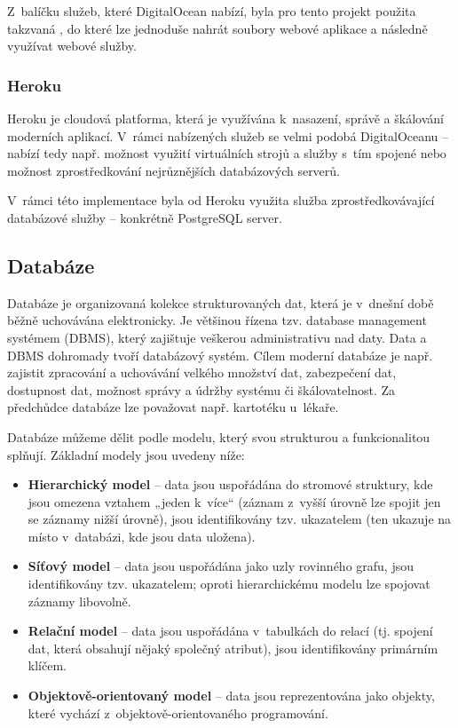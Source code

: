 		Z~balíčku služeb, které DigitalOcean nabízí, byla pro tento projekt použita takzvaná  \cite{DO3}, do které lze jednoduše nahrát soubory webové aplikace a následně využívat webové služby.
		
		\subsubsection{Heroku}\label{sec:heroku}
		Heroku je cloudová platforma, která je využívána k~nasazení, správě a škálování moderních aplikací. V~rámci nabízených služeb se velmi podobá DigitalOceanu – nabízí tedy např. možnost využití virtuálních strojů a služby s~tím spojené nebo možnost zprostředkování nejrůznějších databázových serverů. \cite{Heroku1}\cite{Heroku2}
		
		V~rámci této implementace byla od Heroku využita služba zprostředkovávající databázové služby – konkrétně PostgreSQL server. 
		
	\subsection{Databáze}
	Databáze je organizovaná kolekce strukturovaných dat, která je v~dnešní době běžně uchovávána elektronicky. Je většinou řízena tzv. database management systémem (DBMS), který zajištuje veškerou administrativu nad daty. Data a DBMS dohromady tvoří databázový systém. Cílem moderní databáze je např. zajistit zpracování a uchovávání velkého množství dat, zabezpečení dat, dostupnost dat, možnost správy a údržby systému či škálovatelnost. Za předchůdce databáze lze považovat např. kartotéku u~lékaře. \cite{DBSummary}
	
	
	
	Databáze můžeme dělit podle modelu, který svou strukturou a funkcionalitou splňují. Základní modely jsou uvedeny níže: \cite{DBModel}
		
	\begin{itemize}
		\item \textbf{Hierarchický model} – data jsou uspořádána do stromové struktury, kde jsou omezena vztahem „jeden k~více“ (záznam z~vyšší úrovně lze spojit jen se záznamy nižší úrovně), jsou identifikovány tzv. ukazatelem (ten ukazuje na místo v~databázi, kde jsou data uložena). \cite{HierarchDB}
		\item \textbf{Síťový model} – data jsou uspořádána jako uzly rovinného grafu, jsou identifikovány tzv. ukazatelem; oproti hierarchickému modelu lze spojovat záznamy libovolně. \cite{SitDB} 
		\item \textbf{Relační model} – data jsou uspořádána v~tabulkách do relací (tj. spojení dat, která obsahují nějaký společný atribut), jsou identifikovány primárním klíčem. \cite{RelacDB}
		\item \textbf{Objektově-orientovaný model} – data jsou reprezentována jako objekty, které vychází z~objektově-orientovaného programování. \cite{OOPDB}
	\end{itemize}
	
